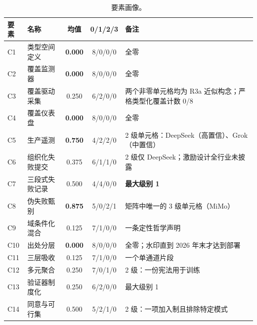 \documentclass[10pt,fontset=fandol]{ctexart}
\begin{document}
\begin{table}[t]
\centering
\caption{要素画像。}
\label{tab:components}
\small
\begin{tabularx}{\textwidth}{l l c c Y}
\toprule
要素 & 名称 & 均值 & 0/1/2/3 & 备注 \\
\midrule
C1 & 类型空间定义 & \textbf{0.000} & 8/0/0/0 & 全零 \\
C2 & 覆盖监测器 & \textbf{0.000} & 8/0/0/0 & 全零 \\
C3 & 覆盖驱动采集 & 0.250 & 6/2/0/0 & 两个非零单元格均为 R3a 近似构念；严格类型化覆盖计数 0/8 \\
C4 & 覆盖仪表盘 & \textbf{0.000} & 8/0/0/0 & 全零 \\
C5 & 生产遥测 & \textbf{0.750} & 4/2/2/0 & 2 级单元格：DeepSeek（高置信）、Grok（中置信） \\
C6 & 组织化失败提交 & 0.375 & 6/1/1/0 & 2 级仅 DeepSeek；激励设计全行业未披露 \\
C7 & 三段式失败记录 & 0.500 & 4/4/0/0 & \textbf{最大级别 1} \\
C8 & 伪失败甄别 & \textbf{0.875} & 5/0/2/1 & 矩阵中唯一的 3 级单元格（MiMo） \\
C9 & 域条件化混合 & 0.125 & 7/1/0/0 & 一条定性哲学声明 \\
C10 & 出处分层 & \textbf{0.000} & 8/0/0/0 & 全零；水印直到 2026 年末才达到部署 \\
C11 & 三层吸收 & 0.125 & 7/1/0/0 & 一个单通道片段 \\
C12 & 多元聚合 & 0.250 & 7/0/1/0 & 2 级：一份宪法用于训练 \\
C13 & 验证器制度化 & 0.250 & 6/2/0/0 & 最大级别 1 \\
C14 & 同意与可行集 & 0.500 & 5/2/1/0 & 2 级：一项加入制且排除特定模式 \\
\bottomrule
\end{tabularx}
\end{table}
\end{document}
